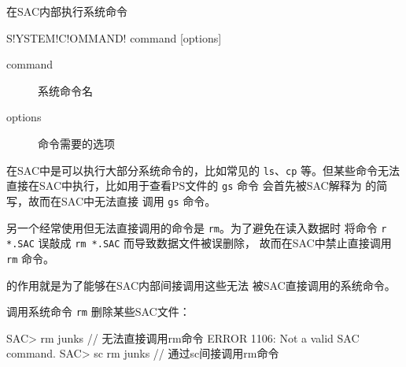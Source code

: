 \label{cmd:systemcommand}

在SAC内部执行系统命令

\begin{SACSTX}
S!YSTEM!C!OMMAND! command [options]
\end{SACSTX}

\begin{description}
\item [command] 系统命令名
\item [options] 命令需要的选项
\end{description}

在SAC中是可以执行大部分系统命令的，比如常见的 \texttt{ls}、\texttt{cp}
等。但某些命令无法直接在SAC中执行，比如用于查看PS文件的 \texttt{gs} 命令
会首先被SAC解释为  的简写，故而在SAC中无法直接
调用 \texttt{gs} 命令。

另一个经常使用但无法直接调用的命令是 \texttt{rm}。为了避免在读入数据时
将命令 \texttt{r *.SAC} 误敲成 \texttt{rm *.SAC} 而导致数据文件被误删除，
故而在SAC中禁止直接调用 \texttt{rm} 命令。

 的作用就是为了能够在SAC内部间接调用这些无法
被SAC直接调用的系统命令。

调用系统命令 \texttt{rm} 删除某些SAC文件：
\begin{SACCode}
SAC> rm junks           // 无法直接调用rm命令
 ERROR 1106: Not a valid SAC command.
SAC> sc rm junks        // 通过sc间接调用rm命令
\end{SACCode}
